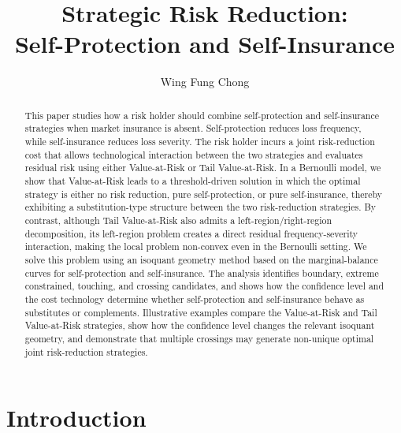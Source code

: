 \documentclass[a4paper,12pt]{article}
\title{\bf Strategic Risk Reduction:\\Self-Protection and Self-Insurance}
\author[$\star$]{Wing Fung Chong}
\affil[$\star$]{Department of Statistics and Actuarial Science, School of Computing and Data Science, The University of Hong Kong, Hong Kong, China. Email: chongwf@hku.hk.}
\begin{document}
\sloppy

\theoremstyle{definition}
\newtheorem{theorem}{Theorem}[section]
\newtheorem{corollary}[theorem]{Corollary}
\newtheorem{lemma}[theorem]{Lemma}
\newtheorem{proposition}[theorem]{Proposition}

\newtheorem{definition}{Definition}[section]
\newtheorem{problem}{Problem}[section]
\newtheorem{remark}{Remark}[section]
\newtheorem{example}{Example}[section]
\setcounter{section}{0}

\maketitle

\begin{abstract}
This paper studies how a risk holder should combine self-protection and self-insurance strategies when market insurance is absent. Self-protection reduces loss frequency, while self-insurance reduces loss severity. The risk holder incurs a joint risk-reduction cost that allows technological interaction between the two strategies and evaluates residual risk using either Value-at-Risk or Tail Value-at-Risk. In a Bernoulli model, we show that Value-at-Risk leads to a threshold-driven solution in which the optimal strategy is either no risk reduction, pure self-protection, or pure self-insurance, thereby exhibiting a substitution-type structure between the two risk-reduction strategies. By contrast, although Tail Value-at-Risk also admits a left-region/right-region decomposition, its left-region problem creates a direct residual frequency-severity interaction, making the local problem non-convex even in the Bernoulli setting. We solve this problem using an isoquant geometry method based on the marginal-balance curves for self-protection and self-insurance. The analysis identifies boundary, extreme constrained, touching, and crossing candidates, and shows how the confidence level and the cost technology determine whether self-protection and self-insurance behave as substitutes or complements. Illustrative examples compare the Value-at-Risk and Tail Value-at-Risk strategies, show how the confidence level changes the relevant isoquant geometry, and demonstrate that multiple crossings may generate non-unique optimal joint risk-reduction strategies.


%
\end{abstract}
\section{Introduction}
\end{document}
